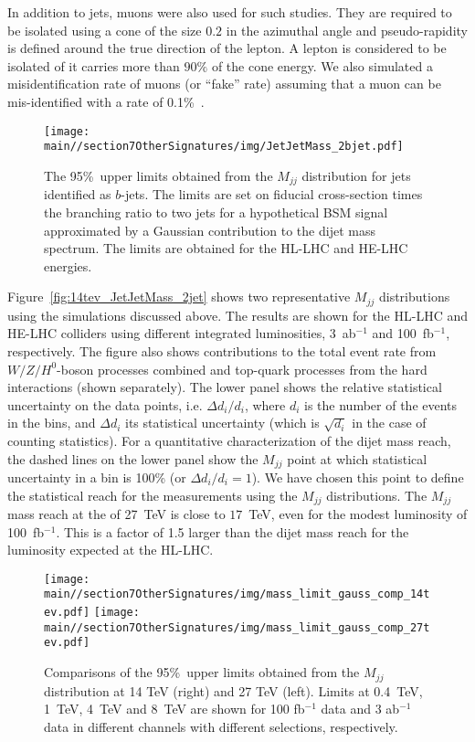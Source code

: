 In addition to jets, muons were also used for such studies. They are  required to be isolated using
a cone of the size $0.2$ in the azimuthal angle and pseudo-rapidity is
defined around the true direction of the lepton.
A lepton is considered to be isolated of it carries more than $90\%$ of the cone energy.
We also simulated a misidentification rate of muons (or ``fake'' rate) assuming that a muon 
can be mis-identified with a rate of 0.1\%~\cite{Aad:2009wy}. 


\begin{figure}[ht]
\begin{center}
   \texttt{[image: \\main//section7OtherSignatures/img/JetJetMass\_2bjet.pdf]}
\end{center}
\caption{The 95\%~\cl upper limits obtained from the
$M_{jj}$  distribution for jets identified as $b$-jets.
The limits are set on fiducial cross-section times the  branching ratio to two jets
for a hypothetical BSM signal approximated by a Gaussian contribution to the dijet mass spectrum.  The limits are obtained for the HL-LHC and HE-LHC energies.}
\label{fig:JetJetMass_bjet}
\end{figure}

Figure~\ref{fig:14tev_JetJetMass_2jet} shows two representative 
$M_{jj}$ distributions using the simulations discussed above. The results are shown for the HL-LHC and HE-LHC colliders using different integrated luminosities,  3~ab$^{-1}$ and 100~fb$^{-1}$, respectively. The figure also shows contributions to the total event rate 
from $W/Z/H^0$-boson processes combined  and
top-quark processes from the hard interactions (shown separately).
The lower panel shows the relative statistical uncertainty on the
data points, i.e. $\Delta d_i/d_i$, where $d_i$ is the number of
the events in the bins, and $\Delta d_i$ its statistical uncertainty (which is $\sqrt{d_i}$ in the case of counting statistics). For a quantitative characterization of the dijet mass reach,
the dashed lines on the lower panel show the $M_{jj}$ point at which
statistical uncertainty in a bin is 100\% (or $\Delta d_i/d_i=1$). We have chosen this point 
to define the statistical reach for the measurements using the $M_{jj}$ distributions.
The $M_{jj}$  mass reach at the \com of 27~TeV is close to
$17$~TeV,  even for the modest luminosity of 100~fb$^{-1}$. This is a factor of 1.5
larger than the dijet mass reach for the luminosity expected at the HL-LHC.

\begin{figure}[ht]
\begin{center}
   \texttt{[image: \\main//section7OtherSignatures/img/mass\_limit\_gauss\_comp\_14tev.pdf]}
   \texttt{[image: \\main//section7OtherSignatures/img/mass\_limit\_gauss\_comp\_27tev.pdf]}
\end{center}
\caption{Comparisons of the  95\%~\cl upper limits obtained from the
$M_{jj}$  distribution at 14 TeV (right) and 27 TeV (left). Limits at 0.4~TeV, 1~TeV, 4~TeV and 8~TeV  are shown for 100 fb$^{-1}$ data and 3 ab$^{-1}$ data in different channels with different selections, respectively. }
\label{fig:JetJetMass_comp}
\end{figure}

